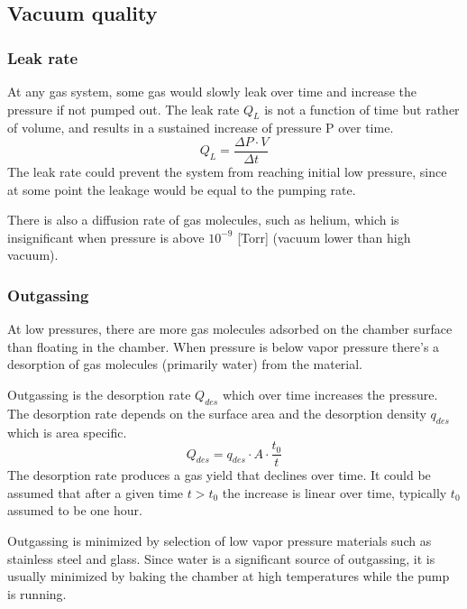 \documentclass[\main/master.tex]{subfiles}
\begin{document}
\subsection{Vacuum quality}
\subsubsection{Leak rate}
At any gas system, some gas would slowly leak over time and increase the pressure if not pumped out. The leak rate $Q_L$ is not a function of time but rather of volume, and results in a sustained increase of pressure P over time.
\begin{equation}
Q_L = \frac{\Delta P\cdot V}{\Delta t}  \label{eqn:energy-mass-equivalence-relation}
\end{equation}
The leak rate could prevent the system from reaching initial low pressure, since at some point the leakage would be equal to the pumping rate.
\par\noindent
There is also a diffusion rate of gas molecules, such as helium, which is insignificant when pressure is above $10^{-9}$ [Torr] (vacuum lower than high vacuum). 

\subsubsection{Outgassing}
At low pressures, there are more gas molecules adsorbed on the chamber surface than floating in the chamber. When pressure is below vapor pressure there's a desorption of gas molecules (primarily water) from the material.
\par\noindent
Outgassing is the desorption rate $Q_{des}$ which over time increases the pressure. The desorption rate depends on the surface area and the desorption density $q_{des}$ which is area specific. 
\begin{equation}
Q_{des} = q_{des}\cdot A\cdot\frac{t_0}{t}  \label{eqn:energy-mass-equivalence-relation}
\end{equation}
The desorption rate produces a gas yield that declines over time. It could be assumed that after a given time $t>t_0$ the increase is linear over time, typically $t_0$ assumed to be one hour.
\par\noindent
Outgassing is minimized by selection of low vapor pressure materials such as stainless steel and glass. Since water is a significant source of outgassing, it is usually minimized by baking the chamber at high temperatures while the pump is running.
\end{document}
